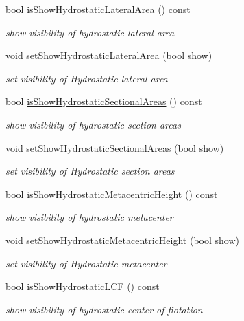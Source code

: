 \begin{DoxyCompactItemize}
bool \hyperlink{classShipCAD_1_1Visibility_aba30b19d4e5367a55969151c0016cbb3}{is\+Show\+Hydrostatic\+Lateral\+Area} () const 
\begin{DoxyCompactList}\small\item\em show visibility of hydrostatic lateral area \end{DoxyCompactList}\item 
void \hyperlink{classShipCAD_1_1Visibility_ae0de0c1b57dd5659f14aada72799b1eb}{set\+Show\+Hydrostatic\+Lateral\+Area} (bool show)
\begin{DoxyCompactList}\small\item\em set visibility of Hydrostatic lateral area \end{DoxyCompactList}\item 
bool \hyperlink{classShipCAD_1_1Visibility_a2e47910da716b799bbde3c68a294f45f}{is\+Show\+Hydrostatic\+Sectional\+Areas} () const 
\begin{DoxyCompactList}\small\item\em show visibility of hydrostatic section areas \end{DoxyCompactList}\item 
void \hyperlink{classShipCAD_1_1Visibility_a78f1decf3555a8a16258ebf6a15f72a1}{set\+Show\+Hydrostatic\+Sectional\+Areas} (bool show)
\begin{DoxyCompactList}\small\item\em set visibility of Hydrostatic section areas \end{DoxyCompactList}\item 
bool \hyperlink{classShipCAD_1_1Visibility_ab259b53a47e2fbc55ecd7af3c0a93723}{is\+Show\+Hydrostatic\+Metacentric\+Height} () const 
\begin{DoxyCompactList}\small\item\em show visibility of hydrostatic metacenter \end{DoxyCompactList}\item 
void \hyperlink{classShipCAD_1_1Visibility_a8ad7b1588f4de79f93744221ae3a93f4}{set\+Show\+Hydrostatic\+Metacentric\+Height} (bool show)
\begin{DoxyCompactList}\small\item\em set visibility of Hydrostatic metacenter \end{DoxyCompactList}\item 
bool \hyperlink{classShipCAD_1_1Visibility_a214f612de34acb1d51ed5687db0d0f14}{is\+Show\+Hydrostatic\+L\+CF} () const 
\begin{DoxyCompactList}\small\item\em show visibility of hydrostatic center of flotation \end{DoxyCompactList}\item 

\end{DoxyCompactItemize}
